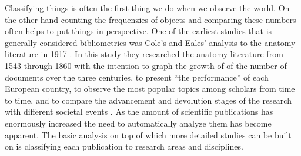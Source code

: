 Classifying things is often the first thing we do when we observe 
the world. On the other hand counting the frequenzies of objects
and comparing these numbers often helps to put things in 
perspective.
One of the earliest studies that is generally considered
bibliometrics was Cole's and Eales' analysis to the anatomy 
literature in 1917 \cite{cole_history_1917}. In this study they 
researched the anatomy literature from 1543 through 1860 with the 
intention to graph the growth of of the number of documents over 
the three centuries, to present ``the performance'' of each 
European country, to observe the most popular topics among 
scholars from time to time, and to compare the advancement and 
devolution stages of the research with different societal 
events \cite{bellis_bibliometrics_2009}.
As the amount of scientific publications has enormously increased
the need to automatically analyze them has become apparent.
The basic analysis on top of which more detailed studies can be 
built on is classifying each publication to research areas and
disciplines.


